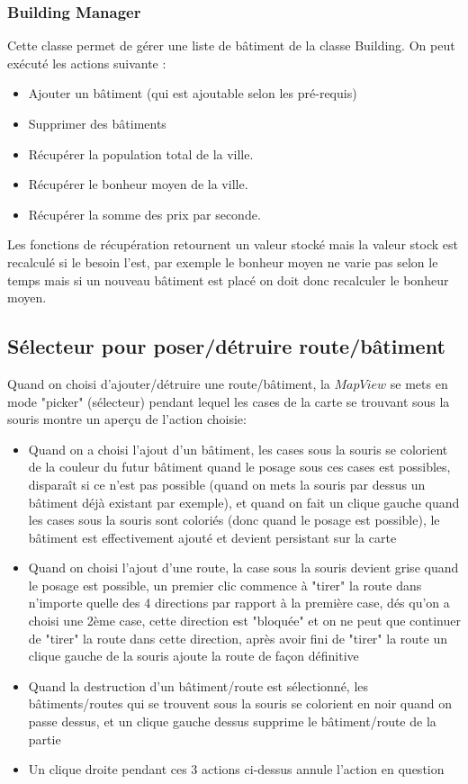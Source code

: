 \documentclass[a4paper,10pt,openany,oneside]{report}
\begin{document}
\subsubsection{Building Manager}
Cette classe permet de gérer une liste de bâtiment de la classe Building. On peut exécuté les actions suivante :
\begin{itemize}
	\item Ajouter un bâtiment (qui est ajoutable selon les pré-requis)
	\item Supprimer des bâtiments 
	\item Récupérer la population total de la ville.
	\item Récupérer le bonheur moyen de la ville.
	\item Récupérer la somme des prix par seconde.
\end{itemize}

Les fonctions de récupération retournent un valeur stocké mais la valeur stock est recalculé si le besoin l'est, par exemple le bonheur moyen ne varie pas selon le temps mais si un nouveau bâtiment est placé on doit donc recalculer le bonheur moyen.
\subsection{Sélecteur pour poser/détruire route/bâtiment}
Quand on choisi d'ajouter/détruire une route/bâtiment, la $MapView$ se mets en mode "picker" (sélecteur) pendant lequel les cases de la carte se trouvant sous la souris montre un aperçu de l'action choisie:
\begin{itemize}
\item Quand on a choisi l'ajout d'un bâtiment, les cases sous la souris se colorient de la couleur du futur bâtiment quand le posage sous ces cases est possibles, disparaît si ce n'est pas possible (quand on mets la souris par dessus un bâtiment déjà existant par exemple), et quand on fait un clique gauche quand les cases sous la souris sont coloriés (donc quand le posage est possible), le bâtiment est effectivement ajouté et devient persistant sur la carte
\item Quand on choisi l'ajout d'une route, la case sous la souris devient grise quand le posage est possible, un premier clic commence à "tirer" la route dans n'importe quelle des 4 directions par rapport à la première case, dés qu'on a choisi une 2ème case, cette direction est "bloquée" et on ne peut que continuer de "tirer" la route dans cette direction, après avoir fini de "tirer" la route un clique gauche de la souris ajoute la route de façon définitive
\item Quand la destruction d'un bâtiment/route est sélectionné, les bâtiments/routes qui se trouvent sous la souris se colorient en noir quand on passe dessus, et un clique gauche dessus supprime le bâtiment/route de la partie
\item Un clique droite pendant ces 3 actions ci-dessus annule l'action en question
\end{itemize}
\end{document}
